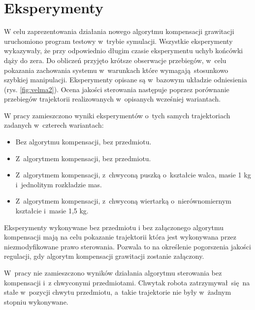 
\chapter{Eksperymenty\label{chap:weryfikacja_systemu}}
\graphicspath{{./velma/przerobione_testy/out/}{./images}}



W celu zaprezentowania działania nowego algorytmu kompensacji grawitacji uruchomiono program testowy w~trybie symulacji. Wszystkie eksperymenty wykazywały, że przy odpowiednio długim czasie eksperymentu uchyb końcówki dąży do zera. Do obliczeń przyjęto krótsze obserwacje przebiegów, w~celu pokazania zachowania systemu w~warunkach które wymagają stosunkowo szybkiej manipulacji.  Eksperymenty opisane są w~bazowym układzie odniesienia (rys. \ref{fig:velma2}).  Ocena jakości sterowania następuje poprzez porównanie przebiegów trajektorii realizowanych w~opisanych wcześniej wariantach.

W pracy zamieszczono wyniki eksperymentów o~tych samych trajektoriach zadanych w~czterech wariantach:
\begin{itemize}
	\item Bez algorytmu kompensacji, bez przedmiotu.
	\item Z~algorytmem kompensacji, bez przedmiotu.
	\item Z~algorytmem kompensacji, z~chwyconą puszką o~kształcie walca, masie 1 kg i~jednolitym rozkładzie mas.
	\item Z~algorytmem kompensacji, z~chwyconą wiertarką o~nierównomiernym kształcie i~masie 1,5 kg.
\end{itemize}
Eksperymenty wykonywane bez przedmiotu i bez załączonego algorytmu kompensacji mają na celu pokazanie trajektorii która jest wykonywana przez niezmodyfikowane prawo sterowania. Pozwala to na określenie pogorszenia jakości regulacji, gdy algorytm kompensacji grawitacji zostanie załączony. 

W~pracy nie zamieszczono wyników działania algorytmu sterowania bez kompensacji i~z chwyconymi przedmiotami. Chwytak robota zatrzymywał się na stałe w~pozycji chwytu przedmiotu, a~takie trajektorie nie były  w~żadnym stopniu wykonywane. 

